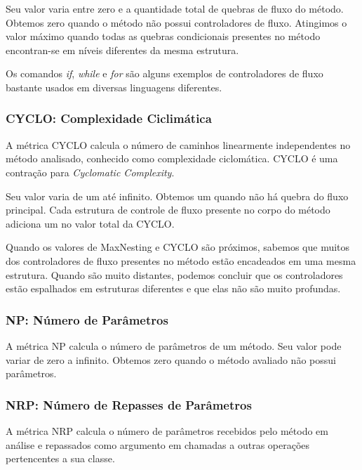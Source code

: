 	Seu valor varia entre zero e a quantidade total de quebras de fluxo do método. Obtemos zero quando o método não possui controladores de fluxo. Atingimos o valor máximo quando todas as quebras condicionais presentes no método encontran-se em níveis diferentes da mesma estrutura.
	
	Os comandos \textit{if}, \textit{while} e \textit{for} são alguns exemplos de controladores de fluxo bastante usados em diversas linguagens diferentes.                
	
                                                             

\subsubsection{CYCLO: Complexidade Ciclimática}

	A métrica CYCLO \citep{McCabe76} calcula o número de caminhos linearmente independentes no método analisado, conhecido como complexidade ciclomática. CYCLO é uma contração para \textit{Cyclomatic Complexity}.
	
	Seu valor varia de um até infinito. Obtemos um quando não há quebra do fluxo principal. Cada estrutura de controle de fluxo presente no corpo do método adiciona um no valor total da CYCLO.
	                          
	Quando os valores de MaxNesting e CYCLO são próximos, sabemos que muitos dos controladores de fluxo presentes no método estão encadeados em uma mesma estrutura. Quando são muito distantes, podemos concluir que os controladores estão espalhados em estruturas diferentes e que elas não são muito profundas.



\subsubsection{NP: Número de Parâmetros}

	A métrica NP calcula o número de parâmetros de um método. Seu valor pode variar de zero a infinito. Obtemos zero quando o método avaliado não possui parâmetros.

                                                             

\subsubsection{NRP: Número de Repasses de Parâmetros}

	A métrica NRP calcula o número de parâmetros recebidos pelo método em análise e repassados como argumento em chamadas a outras operações pertencentes a sua classe.                                                    
	
